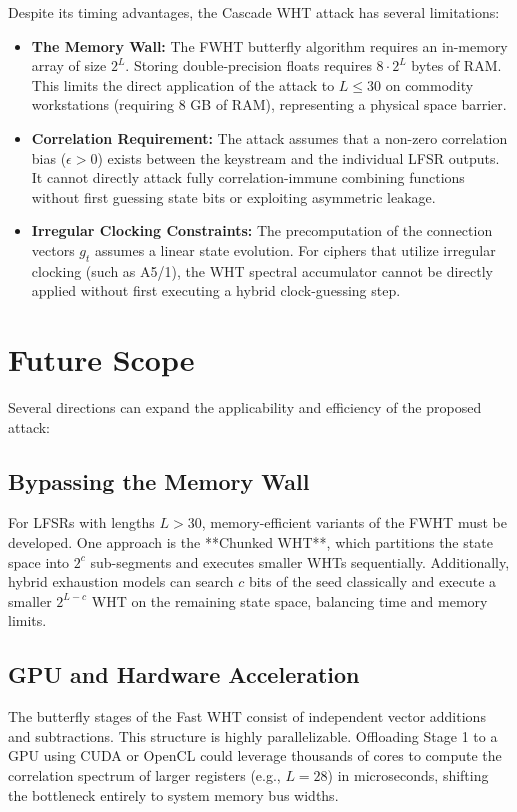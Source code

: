 Despite its timing advantages, the Cascade WHT attack has several limitations:
\begin{itemize}
    \item \textbf{The Memory Wall:} The FWHT butterfly algorithm requires an in-memory array of size $2^L$. Storing double-precision floats requires $8 \cdot 2^L$ bytes of RAM. This limits the direct application of the attack to $L \le 30$ on commodity workstations (requiring 8 GB of RAM), representing a physical space barrier.
    \item \textbf{Correlation Requirement:} The attack assumes that a non-zero correlation bias ($\epsilon > 0$) exists between the keystream and the individual LFSR outputs. It cannot directly attack fully correlation-immune combining functions without first guessing state bits or exploiting asymmetric leakage.
    \item \textbf{Irregular Clocking Constraints:} The precomputation of the connection vectors $g_t$ assumes a linear state evolution. For ciphers that utilize irregular clocking (such as A5/1), the WHT spectral accumulator cannot be directly applied without first executing a hybrid clock-guessing step.
\end{itemize}

\section{Future Scope}
\label{sec:future_scope}

Several directions can expand the applicability and efficiency of the proposed attack:
\subsection{Bypassing the Memory Wall}
For LFSRs with lengths $L > 30$, memory-efficient variants of the FWHT must be developed. One approach is the **Chunked WHT**, which partitions the state space into $2^c$ sub-segments and executes smaller WHTs sequentially. Additionally, hybrid exhaustion models can search $c$ bits of the seed classically and execute a smaller $2^{L-c}$ WHT on the remaining state space, balancing time and memory limits.

\subsection{GPU and Hardware Acceleration}
The butterfly stages of the Fast WHT consist of independent vector additions and subtractions. This structure is highly parallelizable. Offloading Stage 1 to a GPU using CUDA or OpenCL could leverage thousands of cores to compute the correlation spectrum of larger registers (e.g., $L=28$) in microseconds, shifting the bottleneck entirely to system memory bus widths.

